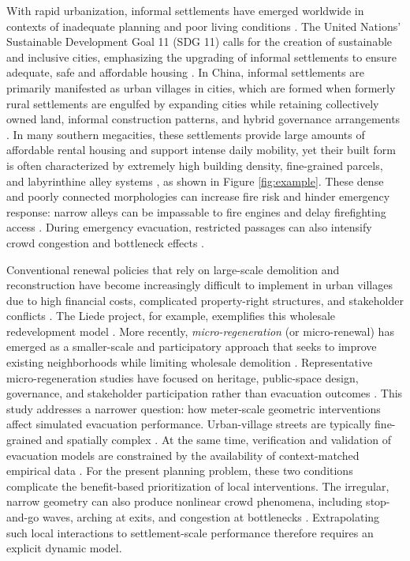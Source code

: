 \documentclass[preprint,12pt]{elsarticle}
\begin{document}
With rapid urbanization, informal settlements have emerged worldwide in contexts of inadequate planning and poor living conditions \citep{un-habitat2004}. The United Nations' Sustainable Development Goal 11 (SDG 11) calls for the creation of sustainable and inclusive cities, emphasizing the upgrading of informal settlements to ensure adequate, safe and affordable housing \citep{unitednations2015transforming,tu2024towards}. In China, informal settlements are primarily manifested as urban villages in cities, which are formed when formerly rural settlements are engulfed by expanding cities while retaining collectively owned land, informal construction patterns, and hybrid governance arrangements \citep{cao2025mapping,Wu2013UrbanVillagesInformality}.
In many southern megacities, these settlements provide large amounts of affordable rental housing and support intense daily mobility, yet their built form is often characterized by extremely high building density, fine-grained parcels, and labyrinthine alley systems \citep{Liu2010UrbanVillages,Lin2011VillageCity}, as shown in Figure \ref{fig:example}.
These dense and poorly connected morphologies can increase fire risk and hinder emergency response: narrow alleys can be impassable to fire engines and delay firefighting access \citep{Tang2010UrbanVillageFire,ChenEtAl2019NarrowAlleys}. During emergency evacuation, restricted passages can also intensify crowd congestion and bottleneck effects \citep{Helbing2000Panic,Helbing2007CrowdDisasters}.



Conventional renewal policies that rely on large-scale demolition and reconstruction have become increasingly difficult to implement in urban villages due to high financial costs, complicated property-right structures, and stakeholder conflicts \citep{zhang2025mapping,Hao2011UrbanVillagesShenzhen}.
The Liede project, for example, exemplifies this wholesale redevelopment model \citep{LiEtAl2014LiedeUrbanPolicy}. More recently, \emph{micro-regeneration} (or micro-renewal) has emerged as a smaller-scale and participatory approach that seeks to improve existing neighborhoods while limiting wholesale demolition \citep{Wang2024MicroRegeneration,Zhu2023MicroRegeneration}.
Representative micro-regeneration studies have focused on heritage, public-space design, governance, and stakeholder participation rather than evacuation outcomes \citep{Wang2024MicroRegeneration,Zhu2023MicroRegeneration}. This study addresses a narrower question: how meter-scale geometric interventions affect simulated evacuation performance.
Urban-village streets are typically fine-grained and spatially complex \citep{Liu2010UrbanVillages,cao2025mapping}. At the same time, verification and validation of evacuation models are constrained by the availability of context-matched empirical data \citep{Ronchi2016VVEvacuationModels}. For the present planning problem, these two conditions complicate the benefit-based prioritization of local interventions.
The irregular, narrow geometry can also produce nonlinear crowd phenomena, including stop-and-go waves, arching at exits, and congestion at bottlenecks \citep{Helbing2000Panic,Helbing2007CrowdDisasters}. Extrapolating such local interactions to settlement-scale performance therefore requires an explicit dynamic model.
\end{document}
